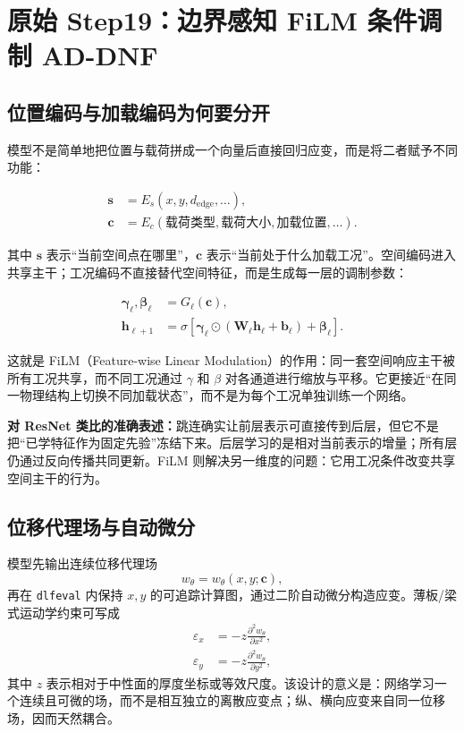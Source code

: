 \documentclass[11pt,a4paper]{article}
\begin{document}
\section{原始 Step19：边界感知 FiLM 条件调制 AD-DNF}

\subsection{位置编码与加载编码为何要分开}

模型不是简单地把位置与载荷拼成一个向量后直接回归应变，而是将二者赋予不同功能：

\begin{align}
\boldsymbol{s} &= E_s(x,y,d_{\mathrm{edge}},\ldots),\\
\boldsymbol{c} &= E_c(\text{载荷类型},\text{载荷大小},\text{加载位置},\ldots).
\end{align}

其中 $\boldsymbol{s}$ 表示“当前空间点在哪里”，$\boldsymbol{c}$ 表示“当前处于什么加载工况”。空间编码进入共享主干；工况编码不直接替代空间特征，而是生成每一层的调制参数：

\begin{align}
\boldsymbol{\gamma}_\ell,\boldsymbol{\beta}_\ell
  &= G_\ell(\boldsymbol{c}),\\
\boldsymbol{h}_{\ell+1}
  &= \sigma\!\left[
  \boldsymbol{\gamma}_\ell\odot
  (\boldsymbol{W}_\ell\boldsymbol{h}_{\ell}+\boldsymbol{b}_\ell)
  +\boldsymbol{\beta}_\ell
  \right].
\end{align}

这就是 FiLM（Feature-wise Linear Modulation）的作用：同一套空间响应主干被所有工况共享，而不同工况通过 $\gamma$ 和 $\beta$ 对各通道进行缩放与平移。它更接近“在同一物理结构上切换不同加载状态”，而不是为每个工况单独训练一个网络。

\begin{methodbox}
\textbf{对 ResNet 类比的准确表述：}跳连确实让前层表示可直接传到后层，但它不是把“已学特征作为固定先验”冻结下来。后层学习的是相对当前表示的增量；所有层仍通过反向传播共同更新。FiLM 则解决另一维度的问题：它用工况条件改变共享空间主干的行为。
\end{methodbox}

\subsection{位移代理场与自动微分}

模型先输出连续位移代理场
\begin{equation}
w_\theta=w_\theta(x,y;\boldsymbol{c}),
\end{equation}
再在 \texttt{dlfeval} 内保持 $x,y$ 的可追踪计算图，通过二阶自动微分构造应变。薄板/梁式运动学约束可写成
\begin{align}
\varepsilon_x &=-z\frac{\partial^2 w_\theta}{\partial x^2},\\
\varepsilon_y &=-z\frac{\partial^2 w_\theta}{\partial y^2},
\end{align}
其中 $z$ 表示相对于中性面的厚度坐标或等效尺度。该设计的意义是：网络学习一个连续且可微的场，而不是相互独立的离散应变点；纵、横向应变来自同一位移场，因而天然耦合。
\end{document}
